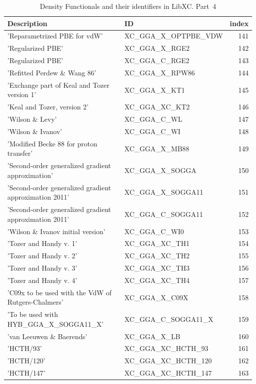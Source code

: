 \documentclass[final,12pt]{article}
\begin{document}
{{{{{{\begin{table}[!h]
\caption{Density Functionals and their identifiers in LibXC. Part~4}
\begin{center}
\begin{tabular}{llr}
\hline
\hline
Description & ID & index\\
\hline
  'Reparametrized PBE for vdW' & XC\_GGA\_X\_OPTPBE\_VDW  &141\\
  'Regularized PBE' & XC\_GGA\_X\_RGE2  &142\\
  'Regularized PBE' & XC\_GGA\_C\_RGE2  &143\\
  'Refitted Perdew \& Wang 86' & XC\_GGA\_X\_RPW86  &144\\
  'Exchange part of Keal and Tozer version 1' & XC\_GGA\_X\_KT1  &145\\
  'Keal and Tozer, version 2' & XC\_GGA\_XC\_KT2  &146\\
  'Wilson \& Levy' & XC\_GGA\_C\_WL  &147\\
  'Wilson \& Ivanov' & XC\_GGA\_C\_WI  &148\\
  'Modified Becke 88 for proton transfer' & XC\_GGA\_X\_MB88  &149\\
  'Second-order generalized gradient approximation' & XC\_GGA\_X\_SOGGA  &150\\
  'Second-order generalized gradient approximation 2011' & XC\_GGA\_X\_SOGGA11  &151\\
  'Second-order generalized gradient approximation 2011' & XC\_GGA\_C\_SOGGA11  &152\\
  'Wilson \& Ivanov initial version' & XC\_GGA\_C\_WI0  &153\\
  'Tozer and Handy v. 1' & XC\_GGA\_XC\_TH1  &154\\
  'Tozer and Handy v. 2' & XC\_GGA\_XC\_TH2  &155\\
  'Tozer and Handy v. 3' & XC\_GGA\_XC\_TH3  &156\\
  'Tozer and Handy v. 4' & XC\_GGA\_XC\_TH4  &157\\
  'C09x to be used with the VdW of Rutgers-Chalmers' & XC\_GGA\_X\_C09X  &158\\
  'To be used with HYB\_GGA\_X\_SOGGA11\_X' & XC\_GGA\_C\_SOGGA11\_X  &159\\
  'van Leeuwen \& Baerends' & XC\_GGA\_X\_LB  &160\\
  'HCTH/93' & XC\_GGA\_XC\_HCTH\_93  &161\\
  'HCTH/120' & XC\_GGA\_XC\_HCTH\_120  &162\\
  'HCTH/147' & XC\_GGA\_XC\_HCTH\_147  &163\\

\end{tabular}
\end{center}
\end{table}}}}}}}
\end{document}

